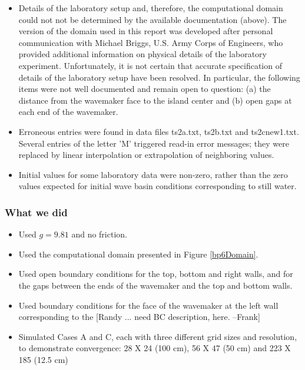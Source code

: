 \begin {itemize}
\item Details of the laboratory setup and, therefore, the computational domain could not not be determined by the available documentation (above).  The version of the domain used in this report was developed after personal communication with Michael Briggs, U.S. Army Corps of Engineers, who  provided additional information on physical details of the laboratory experiment.  Unfortunately, it is not certain that accurate specification of details of the laboratory setup have been resolved.  In particular, the following items were not well documented and remain open to question: (a) the distance from the wavemaker face to the island center and (b) open gaps at each end of the wavemaker.
\item Erroneous entries were found in data files ts2a.txt, ts2b.txt and ts2cnew1.txt.  Several entries of the letter 'M' triggered read-in error messages; they were replaced by linear interpolation or extrapolation of neighboring values.
\item Initial values for some laboratory data were non-zero, rather than the zero values expected for initial wave basin conditions corresponding to still water. 
\end{itemize} 

\subsubsection{What we did}

\begin{itemize}
\item Used $g=9.81$ and no friction.
\item Used the computational domain presented in Figure \ref{bp6Domain}.

\item Used open boundary conditions for the top, bottom and right walls, and for the gaps between the ends of the wavemaker and the top and bottom walls.
\item Used boundary conditions for the face of the wavemaker at the left wall corresponding to the [Randy ... need BC description, here.  --Frank]  
\item Simulated Cases A and C, each with three different grid sizes and resolution, to demonstrate convergence:  28 X 24 (100 cm), 56 X 47 (50 cm) and  223 X 185 (12.5 cm)
\end{itemize}

